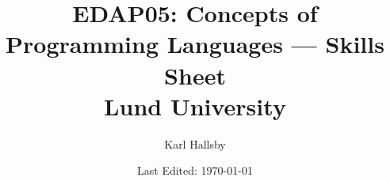 

\usepackage[outputdir=./TeX_Output]{minted} %

% 


\begin{titlepage}
  \title{EDAP05: Concepts of Programming Languages --- Skills Sheet \\ Lund University}
  \author{Karl Hallsby}
  \date{Last Edited: \today} %
\end{titlepage}


\maketitle
{} %
\tableofcontents
\clearpage
{} %















